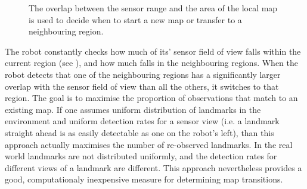 \begin{figure}
\begin{center}
\quad \quad \quad
{}\quad
{}
\end{center}
\caption{The overlap between the sensor range and the area of the local 
         map is used to decide when to start a new map or transfer to a 
         neighbouring region.}
\label{fig:StartNew}
\end{figure}

The robot constantly checks how much of its' sensor field of view
falls within the current region (see ), and
how much falls in the neighbouring regions. When the robot detects
that one of the neighbouring regions has a significantly larger
overlap with the sensor field of view than all the others, it switches
to that region. The goal is to maximise the proportion of observations
that match to an existing map. If one assumes uniform distribution of
landmarks in the environment and uniform detection rates for a sensor
view (i.e. a landmark straight ahead is as easily detectable as one on
the robot's left), than this approach actually maximises the number of
re-observed landmarks. In the real world landmarks are not distributed
uniformly, and the detection rates for different views of a landmark
are different. This approach nevertheless provides a good,
computationaly inexpensive measure for determining map transitions.

